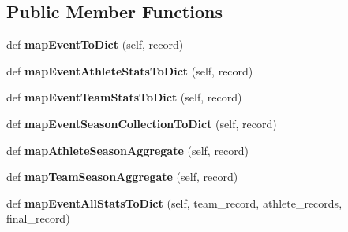 \subsection*{Public Member Functions}
\begin{DoxyCompactItemize}
\item 
\mbox{\label{classhandler_1_1baseball__event_1_1_baseball_event_handler_a29f16fb649711c5a15ca015434ec5de9}} 
def {\bfseries map\+Event\+To\+Dict} (self, record)
\item 
\mbox{\label{classhandler_1_1baseball__event_1_1_baseball_event_handler_a16c256552e606e2aef5e754c76477102}} 
def {\bfseries map\+Event\+Athlete\+Stats\+To\+Dict} (self, record)
\item 
\mbox{\label{classhandler_1_1baseball__event_1_1_baseball_event_handler_a6ed61998d55928accfccd91979b19d06}} 
def {\bfseries map\+Event\+Team\+Stats\+To\+Dict} (self, record)
\item 
\mbox{\label{classhandler_1_1baseball__event_1_1_baseball_event_handler_af56efc054d9ad5e54184723406924ff0}} 
def {\bfseries map\+Event\+Season\+Collection\+To\+Dict} (self, record)
\item 
\mbox{\label{classhandler_1_1baseball__event_1_1_baseball_event_handler_a8f02cc05aa2e7804c5060f49947a927d}} 
def {\bfseries map\+Athlete\+Season\+Aggregate} (self, record)
\item 
\mbox{\label{classhandler_1_1baseball__event_1_1_baseball_event_handler_ae0d638425edb519540911a23cb88be20}} 
def {\bfseries map\+Team\+Season\+Aggregate} (self, record)
\item 
\mbox{\label{classhandler_1_1baseball__event_1_1_baseball_event_handler_adfbb55da2465754cd54a216699a59e03}} 
def {\bfseries map\+Event\+All\+Stats\+To\+Dict} (self, team\+\_\+record, athlete\+\_\+records, final\+\_\+record)
\item 

\end{DoxyCompactItemize}
